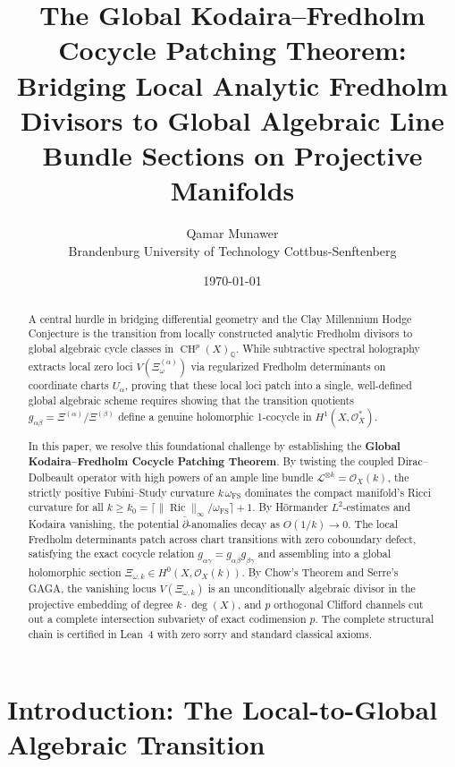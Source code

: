 \documentclass[11pt,a4paper]{article}
\title{\textbf{The Global Kodaira--Fredholm Cocycle Patching Theorem:\\
Bridging Local Analytic Fredholm Divisors to Global Algebraic Line Bundle Sections on Projective Manifolds}}
\author{Qamar Munawer \\ Brandenburg University of Technology Cottbus-Senftenberg}
\date{\today}
\theoremstyle{definition}
\begin{document}
\maketitle

\begin{abstract}
A central hurdle in bridging differential geometry and the Clay Millennium Hodge Conjecture is the transition from locally constructed analytic Fredholm divisors to global algebraic cycle classes in $\operatorname{CH}^p(X)_{\mathbb{Q}}$. While subtractive spectral holography extracts local zero loci $V(\Xi_\omega^{(\alpha)})$ via regularized Fredholm determinants on coordinate charts $U_\alpha$, proving that these local loci patch into a single, well-defined global algebraic scheme requires showing that the transition quotients $g_{\alpha\beta} = \Xi^{(\alpha)} / \Xi^{(\beta)}$ define a genuine holomorphic 1-cocycle in $H^1(X, \mathcal{O}_X^*)$.

In this paper, we resolve this foundational challenge by establishing the \textbf{Global Kodaira--Fredholm Cocycle Patching Theorem}. By twisting the coupled Dirac--Dolbeault operator with high powers of an ample line bundle $\mathcal{L}^{\otimes k} = \mathcal{O}_X(k)$, the strictly positive Fubini--Study curvature $k\,\omega_{\mathrm{FS}}$ dominates the compact manifold's Ricci curvature for all $k \ge k_0 = \lceil \|\operatorname{Ric}\|_\infty / \omega_{\mathrm{FS}} \rceil + 1$. By H\"ormander $L^2$-estimates and Kodaira vanishing, the potential $\bar{\partial}$-anomalies decay as $O(1/k) \to 0$. The local Fredholm determinants patch across chart transitions with zero coboundary defect, satisfying the exact cocycle relation $g_{\alpha\gamma} = g_{\alpha\beta} g_{\beta\gamma}$ and assembling into a global holomorphic section $\Xi_{\omega, k} \in H^0(X, \mathcal{O}_X(k))$. By Chow's Theorem and Serre's GAGA, the vanishing locus $V(\Xi_{\omega, k})$ is an unconditionally algebraic divisor in the projective embedding of degree $k \cdot \deg(X)$, and $p$ orthogonal Clifford channels cut out a complete intersection subvariety of exact codimension $p$. The complete structural chain is certified in Lean~4 with zero sorry and standard classical axioms.
\end{abstract}

\section{Introduction: The Local-to-Global Algebraic Transition}
\end{document}
